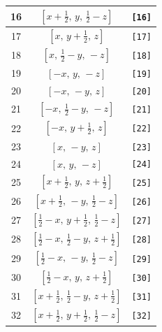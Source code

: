 \documentclass[fleqn,8pt]{jsarticle}
\begin{document}
\begin{longtable}{ccc}
16 & $\left[ x + \frac{1}{2},\, y,\, \frac{1}{2} - z \right]$ & {\tt [16]} \\ \hline
17 & $\left[ x,\, y + \frac{1}{2},\, z \right]$ & {\tt [17]} \\ \hline
18 & $\left[ x,\, \frac{1}{2} - y,\, - z \right]$ & {\tt [18]} \\ \hline
19 & $\left[ - x,\, y,\, - z \right]$ & {\tt [19]} \\ \hline
20 & $\left[ - x,\, - y,\, z \right]$ & {\tt [20]} \\ \hline
21 & $\left[ - x,\, \frac{1}{2} - y,\, - z \right]$ & {\tt [21]} \\ \hline
22 & $\left[ - x,\, y + \frac{1}{2},\, z \right]$ & {\tt [22]} \\ \hline
23 & $\left[ x,\, - y,\, z \right]$ & {\tt [23]} \\ \hline
24 & $\left[ x,\, y,\, - z \right]$ & {\tt [24]} \\ \hline
25 & $\left[ x + \frac{1}{2},\, y,\, z + \frac{1}{2} \right]$ & {\tt [25]} \\ \hline
26 & $\left[ x + \frac{1}{2},\, - y,\, \frac{1}{2} - z \right]$ & {\tt [26]} \\ \hline
27 & $\left[ \frac{1}{2} - x,\, y + \frac{1}{2},\, \frac{1}{2} - z \right]$ & {\tt [27]} \\ \hline
28 & $\left[ \frac{1}{2} - x,\, \frac{1}{2} - y,\, z + \frac{1}{2} \right]$ & {\tt [28]} \\ \hline
29 & $\left[ \frac{1}{2} - x,\, - y,\, \frac{1}{2} - z \right]$ & {\tt [29]} \\ \hline
30 & $\left[ \frac{1}{2} - x,\, y,\, z + \frac{1}{2} \right]$ & {\tt [30]} \\ \hline
31 & $\left[ x + \frac{1}{2},\, \frac{1}{2} - y,\, z + \frac{1}{2} \right]$ & {\tt [31]} \\ \hline
32 & $\left[ x + \frac{1}{2},\, y + \frac{1}{2},\, \frac{1}{2} - z \right]$ & {\tt [32]} \\
\end{longtable}
\end{document}
